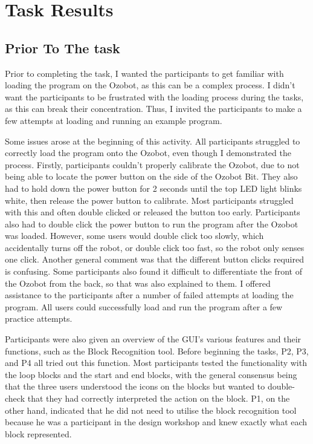 \documentclass[oneside,%
                    author={Malak Hajji},
                    degree={BSc},
                    title={Designing An Accessible Computational Toolkit For Students},
                  subtitle={With Mixed Visual Abilities}]{dissertation}
\begin{document}
\section{Task Results}
\subsection{Prior To The task}

Prior to completing the task, I wanted the participants to get familiar with loading the program on the Ozobot, as this can be a complex process. I didn't want the participants to be frustrated with the loading process during the tasks, as this can break their concentration. Thus, I invited the participants to make a few attempts at loading and running an example program. 

Some issues arose at the beginning of this activity. All participants struggled to correctly load the program onto the Ozobot, even though I demonstrated the process. Firstly, participants couldn't properly calibrate the Ozobot, due to not being able to locate the power button on the side of the Ozobot Bit. They also had to hold down the power button for 2 seconds until the top LED light blinks white, then release the power button to calibrate. Most participants struggled with this and often double clicked or released the button too early. Participants also had to double click the power button to run the program after the Ozobot was loaded. However, some users would double click too slowly, which accidentally turns off the robot, or double click too fast, so the robot only senses one click. Another general comment was that the different button clicks required is confusing. Some participants also found it difficult to differentiate the front of the Ozobot from the back, so that was also explained to them. I offered assistance to the participants after a number of failed attempts at loading the program. All users could successfully load and run the program after a few practice attempts. 

Participants were also given an overview of the GUI's various features and their functions, such as the Block Recognition tool. Before beginning the tasks, P2, P3, and P4 all tried out this function. Most participants tested the functionality with the loop blocks and the start and end blocks, with the general consensus being that the three users understood the icons on the blocks but wanted to double-check that they had correctly interpreted the action on the block. P1, on the other hand, indicated that he did not need to utilise the block recognition tool because he was a participant in the design workshop and knew exactly what each block represented.
\end{document}
